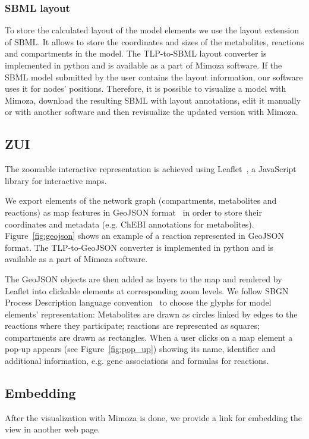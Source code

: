 \documentclass{bmcart}
\begin{document}
\subsubsection*{SBML layout}
To store the calculated layout of the model elements we use the layout extension~\cite{Gauges2013} of SBML. It allows to store the coordinates and sizes of the metabolites, reactions and compartments in the model. The TLP-to-SBML layout converter is implemented in python and is available as a part of Mimoza software.
If the SBML model submitted by the user contains the layout information, our software uses it for nodes' positions. Therefore, it is possible to visualize a model with Mimoza, download the resulting SBML with layout annotations, edit it manually or with another software and then revisualize the updated version with Mimoza.
 
\subsection*{ZUI}

The zoomable interactive representation is achieved using Leaflet~\cite{Agafonkin}, a JavaScript library for interactive maps. 

We export elements of the network graph (compartments, metabolites and reactions) as map features in GeoJSON format~\cite{Butler} in order to store their coordinates and metadata (e.g. ChEBI annotations for metabolites). Figure~\ref{fig:geojson} shows an example of a reaction represented in GeoJSON format. The TLP-to-GeoJSON converter is implemented in python and is available as a part of Mimoza software. 

The GeoJSON objects are then added as layers to the map and rendered by Leaflet into clickable elements at corresponding zoom levels. We follow SBGN Process Description language convention~\cite{LeNovere2009} to choose the glyphs for model elements' representation: Metabolites are drawn as circles linked by edges to the reactions where they participate; reactions are represented as squares; compartments are drawn as rectangles.  When a user clicks on a map element a pop-up appears (see Figure~\ref{fig:pop_up}) showing its name, identifier and additional information, e.g. gene associations and formulas for reactions. 
 

\subsection*{Embedding}
After the visualization with Mimoza is done, we provide a link for embedding the view in another web page.
\end{document}
